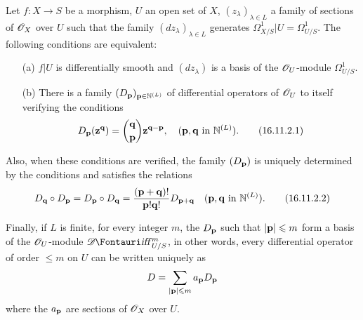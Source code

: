 \begin{theorem}[16.11.2]
\label{IV.16.11.2}
Let $f:X \to S$ be a morphism, $U$ an open set of $X$, $(z_\lambda)_{\lambda \in L}$ a family of sections of $\mathscr{O}_X$ over $U$ such that the family $(dz_\lambda)_{\lambda \in L}$ generates $\Omega_{X/S}^1|U = \Omega_{U/S}^1$.
The following conditions are equivalent:
\begin{enumerate}
  \item[(a)] $f|U$ is differentially smooth and $(dz_\lambda)$ is a basis of the $\mathscr{O}_U$-module $\Omega_{U/S}^1$.
  \item[(b)] There is a family $(D_{\mathbf p})_{\mathbf{p} \in \mathbb{N}^{(L)}}$ of differential operators of $\mathscr{O}_U$ to itself verifying the conditions
  \[
    \label{IV.16.11.2.1}
    D_{\mathbf p} (\mathbf{z}^{\mathbf q}) = \binom{\mathbf q}{\mathbf p} \mathbf{z}^{\mathbf{q} - \mathbf{p}}, \quad (\mathbf{p}, \mathbf{q} \text{ in } \mathbb{N}^{(L)}).
    \tag{16.11.2.1}
  \]
\end{enumerate}

Also, when these conditions are verified, the family $(D_\mathbf{p})$ is uniquely determined by the conditions  and satisfies the relations
\[
  \label{IV.16.11.2.2}
  D_{\mathbf q} \circ D_{\mathbf p} = D_{\mathbf p} \circ D_{\mathbf q} = \frac{(\mathbf{p} + \mathbf{q})!}{\mathbf{p}!\mathbf{q}!}D_{\mathbf{p} + \mathbf{q}} \quad (\mathbf{p}, \mathbf{q} \text{ in }  \mathbb{N}^{(L)}).
  \tag{16.11.2.2}
\]

Finally, if $L$ is finite, for every integer $m$, the $D_{\mathbf p}$ such that $|\mathbf{p}| \leqslant m$ form a basis of the $\mathscr{O}_U$-module $\shDiff_{U/S}^m$, in other words, every differential operator of order $\leq m$ on $U$ can be written uniquely as
\[
  D = \sum_{|\mathbf{p}| \leqslant m} a_{\mathbf p} D_{\mathbf p}
\] 
where the $a_{\mathbf p}$ are sections of $\mathscr{O}_X$ over $U$.
\end{theorem}

